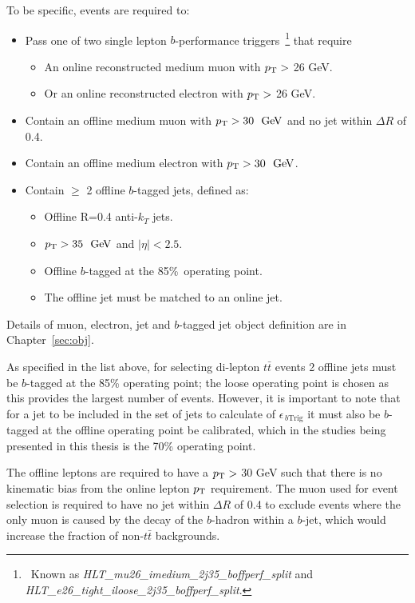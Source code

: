 \noindent
To be specific, events are required to:
\vspace{-1em}
\begin{itemize}
\item Pass one of two single lepton $b$-performance triggers~\footnote{\ Known as \textit{HLT\_mu26\_imedium\_2j35\_boffperf\_split} and \textit{HLT\_e26\_tight\_iloose\_2j35\_boffperf\_split}.}
  that require
    \begin{itemize}[label={$-$}]
    \item An online reconstructed medium muon with $p_{\mathrm{T}} >$ 26 GeV.
    \item Or an online reconstructed electron with $p_{\mathrm{T}} >$ 26 GeV.
    \end{itemize}
\item Contain an offline medium muon with $\pT>30~\GeV$ and no jet within $\Delta R$ of 0.4.
\item Contain an offline medium electron with $\pT>30~\GeV$.
\item Contain $\geq$ 2 offline $b$-tagged jets, defined as:
   \begin{itemize}[label={$-$}]
     \item Offline R=0.4 anti-$k_T$ jets.
     \item $\pT>35~\GeV$ and $|\eta|<2.5$.
     \item Offline $b$-tagged at the 85\%~operating point.
     \item The offline jet must be matched to an online jet.
    \end{itemize}
\end{itemize}
Details of muon, electron, jet and $b$-tagged jet object definition are in Chapter~\ref{sec:obj}.

As specified in the list above, for selecting di-lepton $t\bar{t}$ events 2 offline jets must be $b$-tagged at the 85\% operating point;
the loose operating point is chosen as this provides the largest number of events.
However, it is important to note that for a jet to be included in the set of jets to calculate of $\epsilon_{\,b\text{Trig}}$
it must also be $b$-tagged at the offline operating point be calibrated,
which in the studies being presented in this thesis is the 70\% operating point.

The offline leptons are required to have a $p_{\mathrm{T}} >$ 30 GeV such that there is no kinematic bias from the online lepton $p_{\mathrm{T}}$ requirement. 
The muon used for event selection is required to have no jet within  $\Delta R$ of 0.4 to exclude %
events where the only muon is caused by the decay of the $b$-hadron within a $b$-jet, which would increase the fraction of non-$t\bar{t}$ backgrounds.

